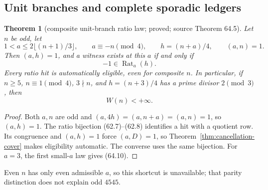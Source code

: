 \documentclass[10pt,reqno]{amsart}
\newtheorem{theorem}{Theorem}[section]
\theoremstyle{definition}
\newcommand{\1}{\mathbf 1}
\begin{document}
\subsection{Unit branches and complete sporadic ledgers}
\begin{theorem}[composite unit-branch ratio law; proved; source Theorem 64.5]
\label{thm:composite-unit-ratio}
Let $n$ be odd, let
\[
 1<a\leq2\lfloor(n+1)/3\rfloor,
 \qquad a\equiv-n\pmod4,
 \qquad h=(n+a)/4,
 \qquad(a,n)=1.
\]
Then $(a,h)=1$, and a witness exists at this $a$ if and only if
\begin{equation}\tag{64.9}
                         -1\in\operatorname {Rat}_a(h).
\end{equation}
Every ratio hit is automatically eligible, even for composite $n$.  In
particular, if $n\geq5$, $n\equiv1\pmod4$, $3\nmid n$, and
$h=(n+3)/4$ has a prime divisor $2\pmod3$, then
\begin{equation}\tag{64.10}
                         W(n)<+\infty.
\end{equation}
\end{theorem}
\begin{proof}
Both $a,n$ are odd and
$(a,4h)=(a,n+a)=(a,n)=1$, so $(a,h)=1$.  The ratio bijection (62.7)--(62.8)
identifies a hit with a quotient row.  Its congruence and $(a,h)=1$ force
$(a,D)=1$, so Theorem~\ref{thm:cancellation-cover} makes eligibility
automatic.  The converse uses the same bijection.  For $a=3$, the first
small-$a$ law gives (64.10).
\end{proof}
Even $n$ has only even admissible $a$, so this shortcut is unavailable;
that parity distinction does not explain odd $4545$.
\end{document}
